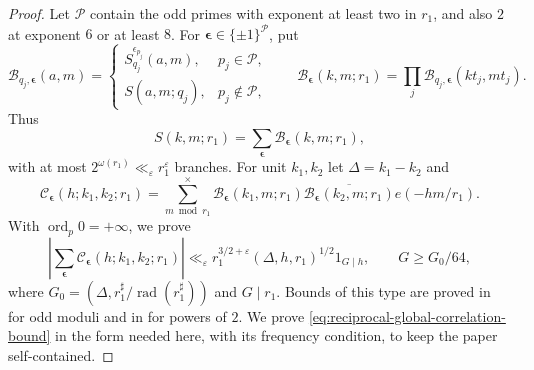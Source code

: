 \documentclass[12pt, a4paper]{amsart}
\numberwithin{equation}{section}
\newcommand{\e}{e}
\newcommand{\ep}{\varepsilon}
\renewcommand{\ge}{\geqslant}
\theoremstyle{plain}
\begin{document}
\begin{proof}
Let $\mathcal P$ contain the odd primes with exponent at least two in $r_1$, and also $2$ at exponent $6$ or at least $8$. For $\boldsymbol\epsilon\in\{\pm1\}^{\mathcal P}$, put
$$
 \mathcal B_{q_j,\boldsymbol\epsilon}(a,m)=
 \begin{cases}
  S_{q_j}^{\epsilon_{p_j}}(a,m),&p_j\in\mathcal P,\\
  S(a,m;q_j),&p_j\notin\mathcal P,
 \end{cases}
 \qquad
 \mathcal B_{\boldsymbol\epsilon}(k,m;r_1)
 =\prod_j\mathcal B_{q_j,\boldsymbol\epsilon}(kt_j,mt_j).
$$
Thus
$$
S(k,m;r_1)=\sum_{\boldsymbol\epsilon}\mathcal B_{\boldsymbol\epsilon}(k,m;r_1),
$$
with at most $2^{\omega(r_1)}\ll_\ep r_1^\ep$ branches. For unit $k_1,k_2$ let $\Delta=k_1-k_2$ and
\begin{equation}\label{eq:reciprocal-complete-correlation-definition}
 \mathcal C_{\boldsymbol\epsilon}(h;k_1,k_2;r_1)
 =\sum_{m\bmod r_1}^{\times}
  \mathcal B_{\boldsymbol\epsilon}(k_1,m;r_1)
  \overline{\mathcal B_{\boldsymbol\epsilon}(k_2,m;r_1)}
  \e(-hm/r_1).
\end{equation}
With $\operatorname{ord}_p0=+\infty$, we prove
\begin{equation}\label{eq:reciprocal-global-correlation-bound}
 \left|\sum_{\boldsymbol\epsilon}
  \mathcal C_{\boldsymbol\epsilon}(h;k_1,k_2;r_1)\right|
 \ll_\ep r_1^{3/2+\ep}(\Delta,h,r_1)^{1/2}1_{G\mid h},
 \qquad G\ge G_0/64,
\end{equation}
where $G_0=(\Delta,r_1^\sharp/\operatorname{rad}(r_1^\sharp))$ and $G\mid r_1$. Bounds of this type are proved in \cite[Proposition~23]{BM2015} for odd moduli and in \cite[Lemma~3.4]{MQW} for powers of $2$. We prove \eqref{eq:reciprocal-global-correlation-bound} in the form needed here, with its frequency condition, to keep the paper self-contained.


\end{proof}
\end{document}
